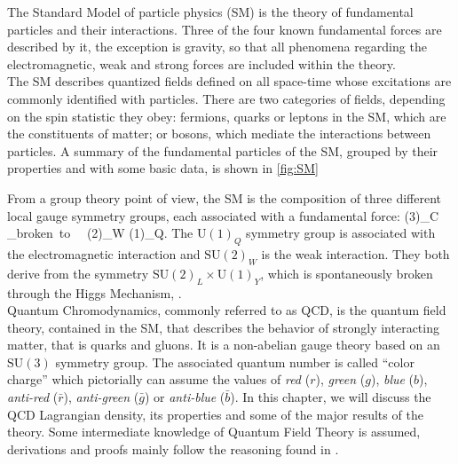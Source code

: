 The Standard Model of particle physics (SM) is the theory of fundamental particles and their interactions. Three of the four known fundamental forces are described by it, the exception is gravity, so that all phenomena regarding the electromagnetic, weak and strong forces are included within the theory. \\
The SM describes quantized fields defined on all space-time whose excitations are commonly identified with particles. There are two categories of fields, depending on the spin statistic they obey: fermions, quarks or leptons in the SM, which are the constituents of matter; or bosons, which mediate the interactions between particles. A summary of the fundamental particles of the SM, grouped by their properties and with some basic data, is shown in \cref{fig:SM}\\
\begin{center}
  
\end{center}
\vspace{-2cm}
From a group theory point of view, the SM is the composition of three different local gauge symmetry groups, each associated with a fundamental force:
\beq
    (3)_C \times {}_{broken~to~~ (2)_W \times {}(1)_{Q}}.
\eeq
The $\mathrm{U}(1)_{Q}$ symmetry group is associated with the electromagnetic interaction and $\mathrm{SU}(2)_{W}$ is the weak interaction. They both derive from the symmetry $\mathrm{SU}(2)_L \times \mathrm{U}(1)_{Y}$, which is spontaneously broken through the Higgs Mechanism, . \\ 
Quantum Chromodynamics, commonly referred to as QCD, is the quantum field theory, contained in the SM, that describes the behavior of strongly interacting matter, that is quarks and gluons. It is a non-abelian gauge theory based on an $\mathrm{SU}(3)$ symmetry group. The associated quantum number is called ``color charge'' which pictorially can assume the values of \textit{red} ($r$), \textit{green} ($g$), \textit{blue} ($b$), \textit{anti-red} ($\bar r$), \textit{anti-green} ($\bar g$) or \textit{anti-blue} ($\bar b$). In this chapter, we will discuss the QCD Lagrangian density, its properties and some of the major results of the theory. Some intermediate knowledge of Quantum Field Theory is assumed, derivations and proofs mainly follow the reasoning found in \cite{peskin}.  

